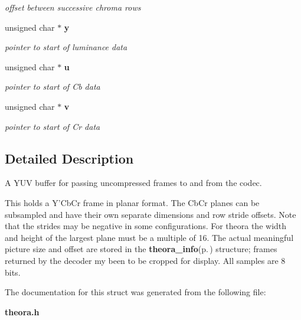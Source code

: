 \begin{CompactItemize}
\begin{CompactList}\small\item\em offset between successive chroma rows \item\end{CompactList}\item 
unsigned char $\ast$ {\bf y}\label{structyuv__buffer_o6}

\begin{CompactList}\small\item\em pointer to start of luminance data \item\end{CompactList}\item 
unsigned char $\ast$ {\bf u}\label{structyuv__buffer_o7}

\begin{CompactList}\small\item\em pointer to start of Cb data \item\end{CompactList}\item 
unsigned char $\ast$ {\bf v}\label{structyuv__buffer_o8}

\begin{CompactList}\small\item\em pointer to start of Cr data \item\end{CompactList}\end{CompactItemize}


\subsection{Detailed Description}
A YUV buffer for passing uncompressed frames to and from the codec. 

This holds a Y'Cb\-Cr frame in planar format. The Cb\-Cr planes can be subsampled and have their own separate dimensions and row stride offsets. Note that the strides may be negative in some configurations. For theora the width and height of the largest plane must be a multiple of 16. The actual meaningful picture size and offset are stored in the {\bf theora\_\-info}{\rm (p.\,\pageref{structtheora__info})} structure; frames returned by the decoder my been to be cropped for display. All samples are 8 bits. 



The documentation for this struct was generated from the following file:\begin{CompactItemize}
\item 
{\bf theora.h}\end{CompactItemize}

